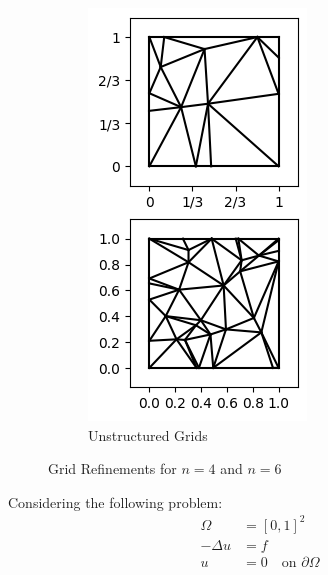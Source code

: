 \documentclass[11pt,a4paper]{article}
\begin{document}
\begin{multicols}{2}
\begin{figure}[H]
\begin{subfigure}{.5\linewidth}
    \includegraphics[width=.9\linewidth]{unstructured_grids}
    \caption{Unstructured Grids}
  \end{subfigure}
  \caption{Grid Refinements for $n=4$ and $n=6$}
  \label{fig:grids}
\end{figure}

Considering the following problem:
\begin{equation}
  \label{eq:smooth_poisson_prob}
  \begin{split}
    \Omega &= \left[0,1\right]^2\\
    -\Delta u &= f\\
    u &= 0 \quad \text{on } \partial \Omega\\
  \end{split}
\end{equation}


\end{multicols}
\end{document}

